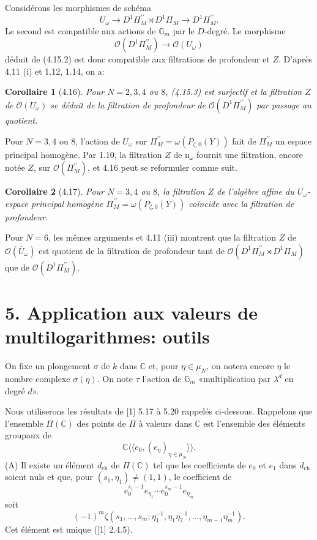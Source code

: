 \documentclass[10pt,a4paper]{article}
\newcommand{\Gm}{\mathbb G_m}
\newcommand{\OO}{\mathcal O}
\newcommand{\uomega}{\mathfrak u_\omega}
\newcommand{\C}{\mathbb C}
\theoremstyle{deligne}
\newtheorem*{corollary*}{Corollaire}
\newcommand{\heading}[1]{\vspace{0.65em}\noindent{\bfseries #1}\quad}
\begin{document}
Considérons les morphismes de schéma
\[
\tag{4.15.2}
U_\omega\longrightarrow D^1\Pi_M^{\prime\prime}\rtimes D^1\Pi_M\longrightarrow D^1\Pi_M^{\prime\prime}.
\]
Le second est compatible aux actions de \(\Gm\) par le \(D\)-degré. Le morphisme
\[
\tag{4.15.3}
\OO(D^1\Pi_M^{\prime\prime})\longrightarrow \OO(U_\omega)
\]
déduit de (4.15.2) est donc compatible aux filtrations de profondeur et \(Z\). D'après 4.11 (i) et 1.12, 1.14, on a:

\begin{corollary*}[4.16]
Pour \(N=2,3,4\) ou \(8\), (4.15.3) est surjectif et la filtration \(Z\) de \(\OO(U_\omega)\) se déduit de la filtration de profondeur de \(\OO(D^1\Pi_M^{\prime\prime})\) par passage au quotient.
\end{corollary*}

Pour \(N=3,4\) ou \(8\), l'action de \(U_\omega\) sur \(\Pi_M^{\prime\prime}=\omega(P_{\zeta,0}(Y))\) fait de \(\Pi_M^{\prime\prime}\) un espace principal homogène. Par 1.10, la filtration \(Z\) de \(\uomega\) fournit une filtration, encore notée \(Z\), sur \(\OO(\Pi_M^{\prime\prime})\), et 4.16 peut se reformuler comme suit.

\begin{corollary*}[4.17]
Pour \(N=3,4\) ou \(8\), la filtration \(Z\) de l'algèbre affine du \(U_\omega\)-espace principal homogène \(\Pi_M^{\prime\prime}=\omega(P_{\zeta,0}(Y))\) coïncide avec la filtration de profondeur.
\end{corollary*}

\heading{4.18.} Pour \(N=6\), les mêmes arguments et 4.11 (iii) montrent que la filtration \(Z\) de \(\OO(\overline U_\omega)\) est quotient de la filtration de profondeur tant de \(\OO(D^1\Pi_M^{\prime\prime}\rtimes D^1\Pi_M)\) que de \(\OO(D^1\Pi_M^{\prime\prime})\).

\section*{5. Application aux valeurs de multilogarithmes: outils}

On fixe un plongement \(\sigma\) de \(k\) dans \(\C\) et, pour \(\eta\in\mu_N\), on notera encore \(\eta\) le nombre complexe \(\sigma(\eta)\). On note \(\tau\) l'action de \(\Gm\) «multiplication par \(\lambda^d\) en degré \(d\)».

\heading{5.1.} Nous utiliserons les résultats de [1] 5.17 à 5.20 rappelés ci-dessous. Rappelons que l'ensemble \(\Pi(\C)\) des points de \(\Pi\) à valeurs dans \(\C\) est l'ensemble des éléments groupaux de
\[
 \C\langle\!\langle e_0,(e_\eta)_{\eta\in\mu_N}\rangle\!\rangle .
\]
(A) Il existe un élément \(d_{\mathrm{ch}}\) de \(\Pi(\C)\) tel que les coefficients de \(e_0\) et \(e_1\) dans \(d_{\mathrm{ch}}\) soient nuls et que, pour \((s_1,\eta_1)\ne(1,1)\), le coefficient de
\[
 e_0^{s_1-1}e_{\eta_1}\cdots e_0^{s_m-1}e_{\eta_m}
\]
soit
\[
 (-1)^m\zeta(s_1,\ldots,s_m;\eta_1^{-1},\eta_1\eta_2^{-1},\ldots,\eta_{m-1}\eta_m^{-1}).
\]
Cet élément est unique ([1] 2.4.5).
\end{document}
